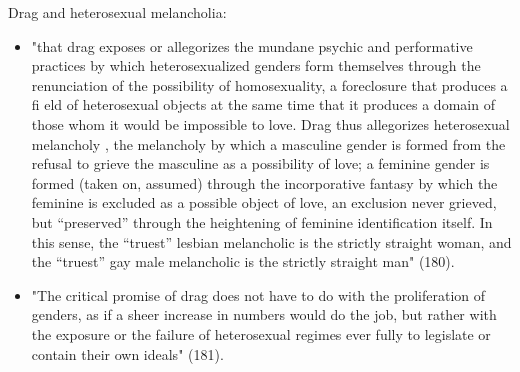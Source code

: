 \documentclass[11pt]{article}
\begin{document}
Drag and heterosexual melancholia:
\begin{itemize}
\item "that drag exposes or allegorizes the mundane psychic and
performative practices by which heterosexualized genders form
themselves through the renunciation of the possibility of
homosexuality, a foreclosure that produces a fi eld of heterosexual
objects at the same time that it produces a domain of those whom it
would be impossible to love. Drag thus allegorizes heterosexual
melancholy , the melancholy by which a masculine gender is formed
from the refusal to grieve the masculine as a possibility of love; a
feminine gender is formed (taken on, assumed) through the
incorporative fantasy by which the feminine is excluded as a
possible object of love, an exclusion never grieved, but “preserved”
through the heightening of feminine identification itself. In this
sense, the “truest” lesbian melancholic is the strictly straight
woman, and the “truest” gay male melancholic is the strictly
straight man" (180).
\item "The critical promise of drag does not have to do with the
proliferation of genders, as if a sheer increase in numbers would do
the job, but rather with the exposure or the failure of heterosexual
regimes ever fully to legislate or contain their own ideals" (181).
\end{itemize}
\end{document}
